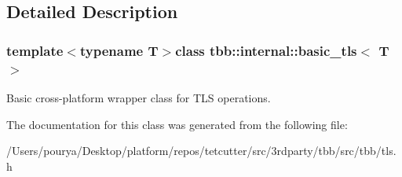 \subsection{Detailed Description}
\subsubsection*{template$<$typename T$>$class tbb\+::internal\+::basic\+\_\+tls$<$ T $>$}

Basic cross-\/platform wrapper class for T\+L\+S operations. 

The documentation for this class was generated from the following file\+:\begin{DoxyCompactItemize}
\item 
/\+Users/pourya/\+Desktop/platform/repos/tetcutter/src/3rdparty/tbb/src/tbb/tls.\+h\end{DoxyCompactItemize}
